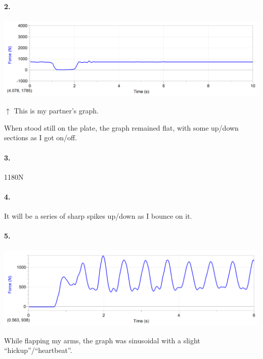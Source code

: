         \paragraph*{2.}

        \begin{mdframed}
            \includegraphics[width=\textwidth]{image3.png}

            $\uparrow$ This is my partner's graph.

            When stood still on the plate, the graph remained flat, with some up/down sections as I got on/off.
        \end{mdframed}

        \paragraph*{3.}

        \begin{mdframed}
            1180N
        \end{mdframed}

        \paragraph*{4.}

        \begin{mdframed}
            It will be a series of sharp spikes up/down as I bounce on it.
        \end{mdframed}

        \paragraph*{5.}

        \begin{mdframed}
            \includegraphics[width=\textwidth]{image2.png}

            While flapping my arms, the graph was sinusoidal with a slight ``hickup''/``heartbeat''.
        \end{mdframed}


